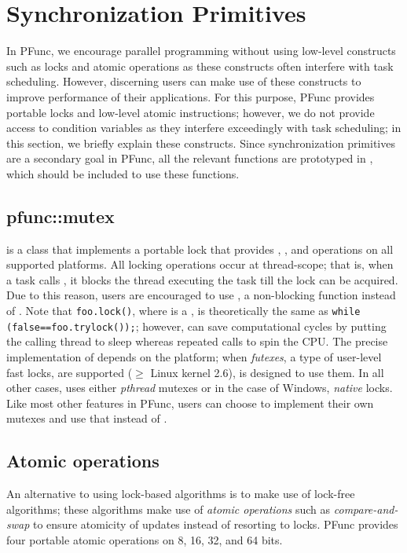 \section{Synchronization Primitives}
\label{sec:sync}
%
In PFunc, we encourage parallel programming without using low-level constructs
such as locks and atomic operations as these constructs often interfere with
task scheduling.
%
However, discerning users can make use of these constructs to improve
performance of their applications.
%
For this purpose, PFunc provides portable locks and low-level atomic
instructions; however, we do not provide access to condition variables as they
interfere exceedingly with task scheduling; in this section, we briefly explain
these constructs.
%
Since synchronization primitives are a secondary goal in PFunc, all the
relevant functions are prototyped in , which should
be included to use these functions.

\subsection{pfunc::mutex}
\label{subsec:mutex}
%
 is a \Cpp{} class that implements a portable lock that
provides , , and  operations on all
supported platforms.
%
All locking operations occur at thread-scope; that is, when a task calls
, it blocks the thread executing the task till the lock can be 
acquired.
%
Due to this reason, users are encouraged to use , a non-blocking
function instead of .
%
Note that \lstinline{foo.lock()}, where  is a , is
theoretically the same as \lstinline{while (false==foo.trylock());}; however, 
 can save computational cycles by putting the calling thread to 
sleep whereas repeated calls to  spin the CPU.
%
The precise implementation of  depends on the platform; when
\textit{futexes}, a type of user-level fast locks, are supported ($\ge{}$ Linux
kernel 2.6),  is designed to use them.
%
In all other cases,  uses either \textit{pthread} mutexes or
in the case of Windows, \textit{native} locks.
%
Like most other features in PFunc, users can choose to implement their own 
mutexes and use that instead of .
%

\subsection{Atomic operations}
\label{subsec:atomic}
%
An alternative to using lock-based algorithms is to make use of lock-free
algorithms; these algorithms make use of \textit{atomic operations} such as
\textit{compare-and-swap} to ensure atomicity of updates instead of resorting
to locks.
%
PFunc provides four portable atomic operations on 8, 16, 32, and 64 bits.
%
